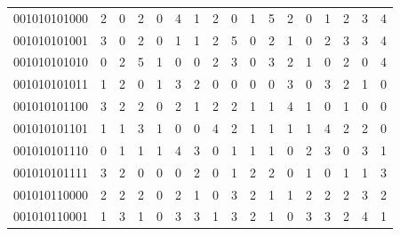 \documentclass[10pt,a4paper]{article}
\begin{document}
\begin{longtable}{ |c|c|c|c|c|c|c|c|c|c|c|c|c|c|c|c|c| }
    001010101000              & 2                            & 0                                & 2                            & 0                              & 4   & 1   & 2   & 0   & 1   & 5   & 2   & 0   & 1   & 2   & 3   & 4   \\
    001010101001              & 3                            & 0                                & 2                            & 0                              & 1   & 1   & 2   & 5   & 0   & 2   & 1   & 0   & 2   & 3   & 3   & 4   \\
    001010101010              & 0                            & 2                                & 5                            & 1                              & 0   & 0   & 2   & 3   & 0   & 3   & 2   & 1   & 0   & 2   & 0   & 4   \\
    001010101011              & 1                            & 2                                & 0                            & 1                              & 3   & 2   & 0   & 0   & 0   & 0   & 3   & 0   & 3   & 2   & 1   & 0   \\
    001010101100              & 3                            & 2                                & 2                            & 0                              & 2   & 1   & 2   & 2   & 1   & 1   & 4   & 1   & 0   & 1   & 0   & 0   \\
    001010101101              & 1                            & 1                                & 3                            & 1                              & 0   & 0   & 4   & 2   & 1   & 1   & 1   & 1   & 4   & 2   & 2   & 0   \\
    001010101110              & 0                            & 1                                & 1                            & 1                              & 4   & 3   & 0   & 1   & 1   & 1   & 0   & 2   & 3   & 0   & 3   & 1   \\
    001010101111              & 3                            & 2                                & 0                            & 0                              & 0   & 2   & 0   & 1   & 2   & 2   & 0   & 1   & 0   & 1   & 1   & 3   \\
    001010110000              & 2                            & 2                                & 2                            & 0                              & 2   & 1   & 0   & 3   & 2   & 1   & 1   & 2   & 2   & 2   & 3   & 2   \\
    001010110001              & 1                            & 3                                & 1                            & 0                              & 3   & 3   & 1   & 3   & 2   & 1   & 0   & 3   & 3   & 2   & 4   & 1   \\

\end{longtable}
\end{document}
